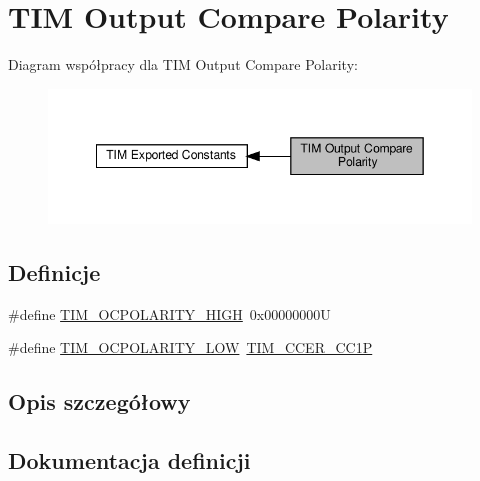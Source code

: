 \hypertarget{group___t_i_m___output___compare___polarity}{}\section{T\+IM Output Compare Polarity}
\label{group___t_i_m___output___compare___polarity}
Diagram współpracy dla T\+IM Output Compare Polarity\+:\nopagebreak
\begin{figure}[H]
\begin{center}
\leavevmode
\includegraphics[width=349pt]{group___t_i_m___output___compare___polarity}
\end{center}
\end{figure}
\subsection*{Definicje}
\begin{DoxyCompactItemize}
\item 
\#define \hyperlink{group___t_i_m___output___compare___polarity_ga5887380660b742f0045e9695914231b8}{T\+I\+M\+\_\+\+O\+C\+P\+O\+L\+A\+R\+I\+T\+Y\+\_\+\+H\+I\+GH}~0x00000000U
\item 
\#define \hyperlink{group___t_i_m___output___compare___polarity_ga1daff1574b0a2d17ccc9ae40a649ac37}{T\+I\+M\+\_\+\+O\+C\+P\+O\+L\+A\+R\+I\+T\+Y\+\_\+\+L\+OW}~\hyperlink{group___peripheral___registers___bits___definition_ga0ca0aedba14241caff739afb3c3ee291}{T\+I\+M\+\_\+\+C\+C\+E\+R\+\_\+\+C\+C1P}
\end{DoxyCompactItemize}


\subsection{Opis szczegółowy}


\subsection{Dokumentacja definicji}
\mbox{\label{group___t_i_m___output___compare___polarity_ga5887380660b742f0045e9695914231b8}} 
